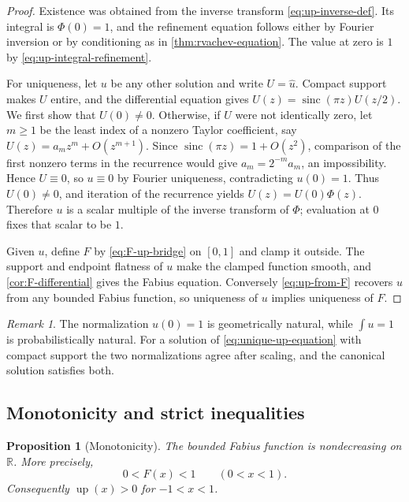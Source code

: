 \documentclass[11pt,oneside]{article}
\newtheorem{proposition}[theorem]{Proposition}
\theoremstyle{definition}
\theoremstyle{remark}
\newtheorem{remark}[theorem]{Remark}
\newcommand{\upf}{\operatorname{up}}
\newcommand{\sinc}{\operatorname{sinc}}
\newcommand{\R}{\mathbb R}
\begin{document}
\begin{proof}
Existence was obtained from the inverse transform \eqref{eq:up-inverse-def}.  Its
integral is $\Phi(0)=1$, and the refinement equation follows either by Fourier
inversion or by conditioning as in \cref{thm:rvachev-equation}.  The value at zero
is $1$ by \eqref{eq:up-integral-refinement}.

For uniqueness, let $u$ be any other solution and write $U=\widehat u$.
Compact support makes $U$ entire, and the differential equation gives
$U(z)=\sinc(\pi z)U(z/2)$.  We first show that $U(0)\ne0$.  Otherwise, if $U$ were
not identically zero, let $m\ge1$ be the least index of a nonzero Taylor
coefficient, say $U(z)=a_mz^m+O(z^{m+1})$.  Since
$\sinc(\pi z)=1+O(z^2)$, comparison of the first nonzero terms in the recurrence
would give $a_m=2^{-m}a_m$, an impossibility.  Hence $U\equiv0$, so $u\equiv0$ by
Fourier uniqueness, contradicting $u(0)=1$.  Thus $U(0)\ne0$, and iteration of the
recurrence yields $U(z)=U(0)\Phi(z)$.  Therefore $u$ is a scalar multiple of the
inverse transform of $\Phi$; evaluation at $0$ fixes that scalar to be $1$.

Given $u$, define $F$ by \eqref{eq:F-up-bridge} on $[0,1]$ and clamp it outside.
The support and endpoint flatness of $u$ make the clamped function smooth, and
\cref{cor:F-differential} gives the Fabius equation.  Conversely
\eqref{eq:up-from-F} recovers $u$ from any bounded Fabius function, so uniqueness
of $u$ implies uniqueness of $F$.
\end{proof}

\begin{remark}
The normalization $u(0)=1$ is geometrically natural, while $\int u=1$ is
probabilistically natural.  For a solution of \eqref{eq:unique-up-equation} with
compact support the two normalizations agree after scaling, and the canonical
solution satisfies both.
\end{remark}

\subsection{Monotonicity and strict inequalities}

\begin{proposition}[Monotonicity]\label{prop:F-monotone}
The bounded Fabius function is nondecreasing on $\R$.  More precisely,
\begin{equation}\label{eq:F-strict-range}
  0<F(x)<1\qquad(0<x<1).
\end{equation}
Consequently $\upf(x)>0$ for $-1<x<1$.
\end{proposition}
\end{document}
